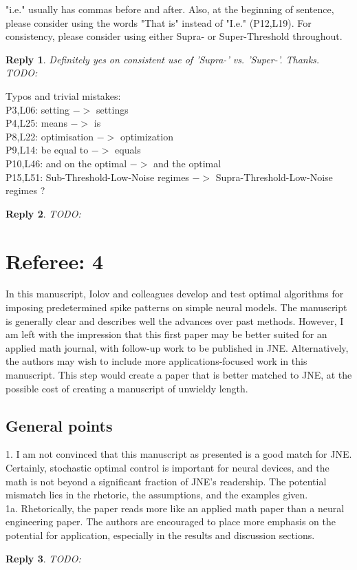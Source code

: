 \documentclass{article}
\newtheorem*{rep}{Reply}
\begin{document}
"i.e." usually has commas before and after. Also, at the beginning of sentence,
please consider using the words "That is" instead of "I.e." (P12,L19). For
consistency, please consider using either Supra- or Super-Threshold throughout.
\begin{rep}
Definitely yes on consistent use of 'Supra-' vs. 'Super-'. Thanks. 
TODO:  
\end{rep}





Typos and trivial mistakes: \\
P3,L06: setting $->$ settings\\
P4,L25: means $->$ is\\
P8,L22: optimisation $->$ optimization\\
P9,L14: be equal to $->$ equals\\
P10,L46: and on the optimal $->$ and the optimal\\
P15,L51: Sub-Threshold-Low-Noise regimes $- >$ Supra-Threshold-Low-Noise regimes
?
\begin{rep}
TODO:
\end{rep}

\clearpage
\section{Referee: 4}
In this manuscript, Iolov and colleagues develop and
test optimal algorithms for imposing predetermined spike patterns on simple
neural models.  The manuscript is generally clear and describes well the
advances over past methods.  However, I am left with the impression that this
first paper may be better suited for an applied math journal, with follow-up
work to be published in JNE.  Alternatively, the authors may wish to include
more applications-focused work in this manuscript.  This step would create a
paper that is better matched to JNE, at the possible cost of creating a
manuscript of unwieldy length.


\subsection{General points}
1. I am not convinced that this manuscript as presented is
a good match for JNE.  Certainly, stochastic optimal control is important for
neural devices, and the math is not beyond a significant fraction of JNE’s
readership.  The potential mismatch lies in the rhetoric, the assumptions, and
the examples given. 
\\1a. Rhetorically, the paper reads more like an applied
math paper than a neural engineering paper.  The authors are encouraged to place more
emphasis on the potential for application, especially in the results and
discussion sections. 
\begin{rep} TODO: \end{rep}
\end{document}
